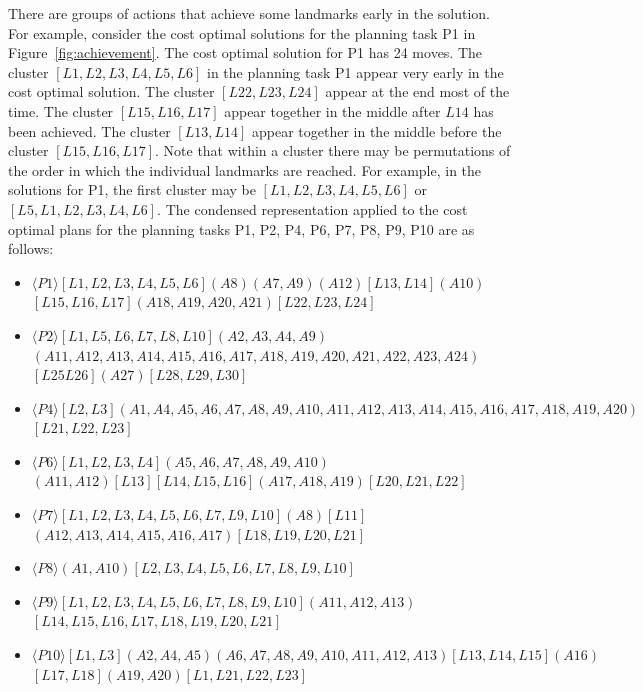 There are groups of actions that achieve some landmarks early in the solution.
For example, consider the cost optimal solutions for the planning task P1 in Figure~\ref{fig:achievement}.
The cost optimal solution for P1 has 24 moves.
The cluster $[L1, L2, L3, L4, L5, L6]$ in the planning task P1 appear very early in the cost optimal solution.
The cluster $[L22, L23, L24]$ appear at the end most of the time.
The cluster $[L15, L16, L17]$ appear together in the middle after $L14$ has been achieved.
The cluster $[L13, L14]$ appear together in the middle before  the cluster $[L15, L16, L17]$.
Note that within a cluster there may be permutations of the order in which the individual landmarks are reached.
For example, in the solutions for P1, the first cluster may be $[L1, L2, L3, L4, L5, L6]$ or $[L5, L1, L2, L3, L4, L6]$.
The condensed representation applied to the cost optimal plans for the planning tasks P1, P2, P4, P6, P7, P8, P9, P10 are as follows:
\begin{itemize}
\item $\langle P1\rangle [L1, L2, L3, L4, L5, L6] (A8) (A7,A9) (A12) [L13, L14] (A10)$ \\ $[L15, L16, L17] (A18, A19, A20, A21) [L22, L23, L24]$
\item  $\langle P2\rangle [L1, L5, L6, L7, L8, L10] (A2, A3, A4, A9)$ \\ $(A11, A12, A13, A14, A15, A16, A17, A18, A19, A20, A21, A22, A23, A24)$ \\ $[L25 L26](A27)[L28, L29, L30]$
\item  $\langle P4\rangle [L2, L3](A1, A4, A5, A6, A7, A8, A9, A10, A11, A12, A13, A14, A15, A16, A17, A18, A19, A20)$\\$[L21, L22, L23]$
\item  $\langle P6\rangle [L1, L2,L3,L4](A5, A6, A7, A8, A9, A10)$ \\ $(A11,A12) [L13][L14, L15, L16](A17,A18,A19)[L20, L21, L22]$
\item  $\langle P7\rangle [L1, L2,L3,L4,L5,L6,L7,L9,L10](A8)[L11]$ \\ $(A12, A13, A14, A15, A16, A17)[L18,L19,L20,L21]$
\item  $\langle P8\rangle (A1,A10) [L2,L3,L4,L5,L6,L7,L8,L9,L10]$
\item  $\langle P9\rangle [L1,L2,L3,L4,L5,L6,L7,L8,L9,L10](A11, A12, A13)$\\$[L14,L15,L16,L17,L18,L19,L20,L21]$
\item  $\langle P10\rangle [L1,L3] (A2,A4,A5) (A6,A7,A8,A9,A10,A11,A12,A13) [L13,L14,L15](A16)$ \\ $[L17,L18] (A19,A20) [L1,L21,L22,L23]$
\end{itemize}


